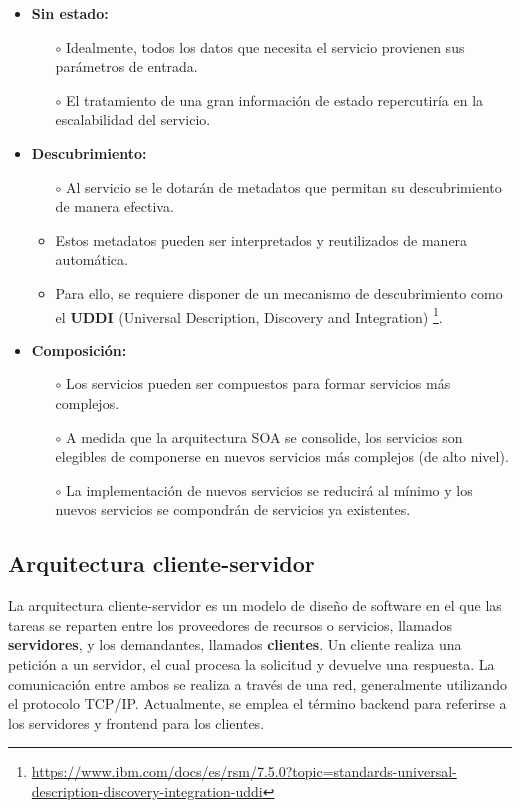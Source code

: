 \begin{itemize}
    \item \textbf{Sin estado:}
    \begin{itemize}
        \item [$\circ$] Idealmente, todos los datos que necesita el servicio provienen sus parámetros de entrada.
        \item [$\circ$] El tratamiento de una gran información de estado repercutiría en la escalabilidad del servicio.
    \end{itemize}
    \item \textbf{Descubrimiento:}
    \begin{itemize}
        \item [$\circ$] Al servicio se le dotarán de metadatos que permitan su descubrimiento de manera efectiva.
        \item Estos metadatos pueden ser interpretados y reutilizados de manera automática.
        \item Para ello, se requiere disponer de un mecanismo de descubrimiento como el \textbf{UDDI} (Universal Description, Discovery and Integration) \footnote{\url{https://www.ibm.com/docs/es/rsm/7.5.0?topic=standards-universal-description-discovery-integration-uddi}}.
    \end{itemize}
    \item \textbf{Composición:}
    \begin{itemize}
        \item [$\circ$] Los servicios pueden ser compuestos para formar servicios más complejos.
        \item [$\circ$] A medida que la arquitectura SOA se consolide, los servicios son elegibles de componerse en nuevos servicios más complejos (de alto nivel).
        \item [$\circ$]La implementación de nuevos servicios se reducirá al mínimo y los nuevos servicios se compondrán de servicios ya existentes.
    \end{itemize}
\end{itemize}

\subsection{Arquitectura cliente-servidor}

La arquitectura cliente-servidor es un modelo de diseño de software en el que las tareas se reparten entre los proveedores de recursos o servicios, llamados \textbf{servidores}, y los demandantes, llamados \textbf{clientes}. Un cliente realiza una petición a un servidor, el cual procesa la solicitud y devuelve una respuesta. La comunicación entre ambos se realiza a través de una red, generalmente utilizando el protocolo TCP/IP. Actualmente, se emplea el término backend para referirse a los servidores y frontend para los clientes.\newline

